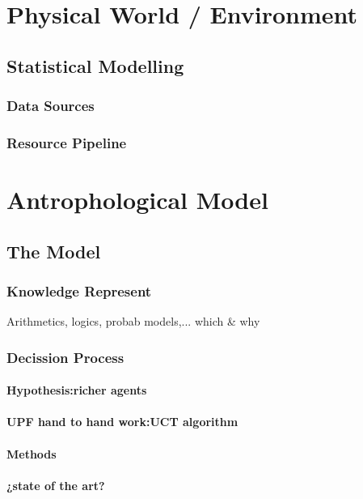\documentclass{report}
\begin{document}
	\section{Physical World / Environment}		%
		\subsection{Statistical Modelling}
			\subsubsection{Data Sources}
			\subsubsection{Resource Pipeline}
			
	\section{Antrophological Model}				%
		\subsection{The Model}
			\subsubsection{Knowledge Represent}
				Arithmetics, logics, probab models,... which \& why
				
			\subsubsection{Decission Process}
				\paragraph{Hypothesis:richer agents}
				\paragraph{UPF hand to hand work:UCT algorithm}
				\paragraph{Methods}
				\paragraph{¿state of the art?}
				
\end{document}
